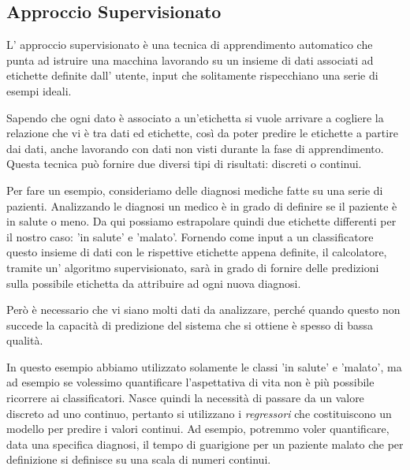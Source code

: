\documentclass[a4paper,12pt]{report}
\begin{document}
\subsection*{Approccio Supervisionato}
L' approccio supervisionato è una tecnica di apprendimento automatico che punta ad istruire una macchina lavorando su un insieme di dati associati ad etichette definite dall' utente, input che solitamente rispecchiano una serie di esempi ideali.

Sapendo che ogni dato è associato a un'etichetta si vuole arrivare a cogliere la relazione che vi è tra dati ed etichette, così da poter predire le etichette a partire dai dati, anche lavorando con dati non visti durante la fase di apprendimento. 
Questa tecnica può fornire due diversi tipi di risultati: discreti o continui. 


Per fare un esempio, consideriamo delle diagnosi mediche fatte su una serie  di pazienti. 
Analizzando le diagnosi un medico è in grado di definire se il paziente è in salute o meno. Da qui possiamo estrapolare quindi due etichette differenti per il nostro caso: 'in salute' e 'malato'. 
Fornendo come input a un classificatore questo insieme di dati con le rispettive etichette appena definite, il calcolatore, tramite un’ algoritmo supervisionato, sarà in grado di fornire delle predizioni sulla possibile etichetta da attribuire ad ogni nuova diagnosi.

Però è necessario che vi siano molti dati da analizzare, perché quando questo non succede la capacità di predizione del sistema che si ottiene è spesso di bassa qualità.

In questo esempio abbiamo utilizzato solamente le classi 'in salute' e 'malato', ma ad esempio se volessimo quantificare l'aspettativa di vita non è più possibile ricorrere ai classificatori. Nasce quindi la necessità di passare da un valore discreto ad uno continuo, pertanto si utilizzano i \textit{regressori} che costituiscono un modello per predire i valori continui.
Ad esempio, potremmo voler quantificare, data una specifica diagnosi, il tempo di guarigione per un paziente malato che per definizione si definisce su una scala di numeri continui.
\end{document}
